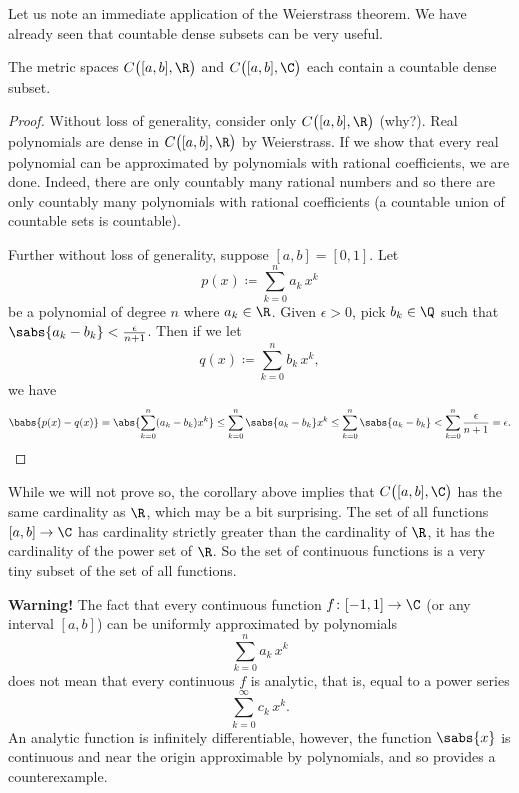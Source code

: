 Let us note an immediate application of the Weierstrass theorem.  We have
already seen that countable dense subsets can be very useful.

\begin{cor}
The metric spaces $C\bigl([a,b],\R\bigr)$ and $C\bigl([a,b],\C\bigr)$ each contain a countable dense subset.
\end{cor}

\begin{proof}
Without loss of generality, consider only
$C\bigl([a,b],\R\bigr)$
(why?).
Real polynomials are dense in $C\bigl([a,b],\R\bigr)$ by Weierstrass.
If we show that
every real polynomial can be approximated by polynomials with rational
coefficients, we are done.
Indeed, there are only countably many
rational numbers and so there are only countably many polynomials with
rational coefficients (a countable union of countable sets is countable).

Further without loss of generality, suppose $[a,b]=[0,1]$.  Let
\begin{equation*}
p(x) \coloneqq \sum_{k=0}^n a_k\,  x^k
\end{equation*}
be a polynomial of degree $n$ where $a_k \in \R$.  Given $\epsilon > 0$, pick $b_k \in \Q$
such that $\sabs{a_k-b_k} < \frac{\epsilon}{n+1}$.  Then
if we let
\begin{equation*}
q(x) \coloneqq \sum_{k=0}^n b_k \, x^k ,
\end{equation*}
we have
\begin{equation*}
\babs{p(x)-q(x)}
=
\abs{\sum_{k=0}^n (a_k-b_k) x^k}
\leq
\sum_{k=0}^n \sabs{a_k-b_k} x^k
\leq
\sum_{k=0}^n \sabs{a_k-b_k}
<
\sum_{k=0}^n \frac{\epsilon}{n+1} = \epsilon . \qedhere
\end{equation*}
\end{proof}

\begin{remark}
While we will not prove so, the corollary above implies that
$C\bigl([a,b],\C\bigr)$ has the same cardinality as $\R$, which may be a
bit surprising.  The set of all functions $[a,b] \to \C$ has
cardinality strictly greater than the cardinality of $\R$, it has the
cardinality of the power set of $\R$.  So the
set of continuous functions is a very tiny subset of the set of all
functions.
\end{remark}

\textbf{Warning!}
The fact that every continuous function $f \colon [-1,1] \to \C$ (or any
interval $[a,b]$) can be uniformly
approximated by polynomials
\begin{equation*}
\sum_{k=0}^n a_k\,  x^k
\end{equation*}
does not mean that every continuous $f$ is analytic, that is, equal to a
power series
\begin{equation*}
\sum_{k=0}^\infty c_k\,  x^k .
\end{equation*}
An analytic function is infinitely differentiable,
however,
the function $\sabs{x}$ is continuous and near the origin
approximable by polynomials,
and so provides a counterexample.


